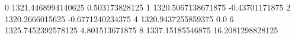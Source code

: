 0 1321.4468994140625 0.503173828125
1 1320.5067138671875 -0.43701171875
2 1320.2666015625 -0.6771240234375
4 1320.9437255859375 0.0
6 1325.7452392578125 4.801513671875
8 1337.15185546875 16.2081298828125
